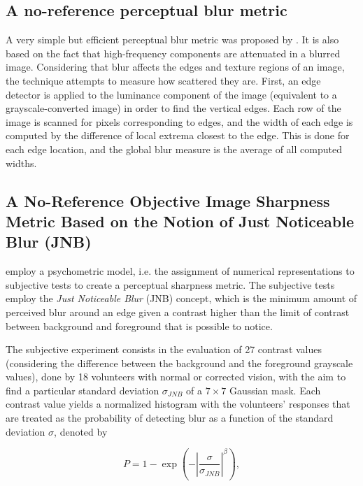 \subsection{A no-reference perceptual blur metric}

A very simple but efficient perceptual blur metric was proposed by . It is also based on the fact that high-frequency components are attenuated in a blurred image. Considering that blur affects the edges and texture regions of an image, the technique attempts to measure how scattered they are. First, an edge detector is applied to the luminance component of the image (equivalent to a grayscale-converted image) in order to find the vertical edges. Each row of the image is scanned for pixels corresponding to edges, and the width of each edge is computed by the difference of local extrema closest to the edge. This is done for each edge location, and the global blur measure is the average of all computed widths.

\subsection{A No-Reference Objective Image Sharpness Metric Based on the Notion of Just Noticeable Blur (JNB)}
\label{subsec:jnb_approach}

 employ a psychometric model, i.e. the assignment of numerical representations to subjective tests to create a perceptual sharpness metric. The subjective tests employ the \emph{Just Noticeable Blur} (JNB) concept, which is the minimum amount of perceived blur around an edge given a contrast higher than the limit of contrast between background and foreground that is possible to notice. 

The subjective experiment consists in the evaluation of 27 contrast values (considering the difference between the background and the foreground grayscale values), done by 18 volunteers with normal or corrected vision, with the aim to find a particular standard deviation $\sigma_{JNB}$ of a $7 \times 7$ Gaussian mask. Each contrast value yields a normalized histogram with the volunteers' responses that are treated as the probability of detecting blur as a function of the standard deviation $\sigma$, denoted by

\begin{equation}
\label{eqn:psychometric_jnb}
P = 1 - \exp{\left( - \left| \frac{\sigma}{\sigma_{JNB} } \right|^{\beta} \right)},
\end{equation}

